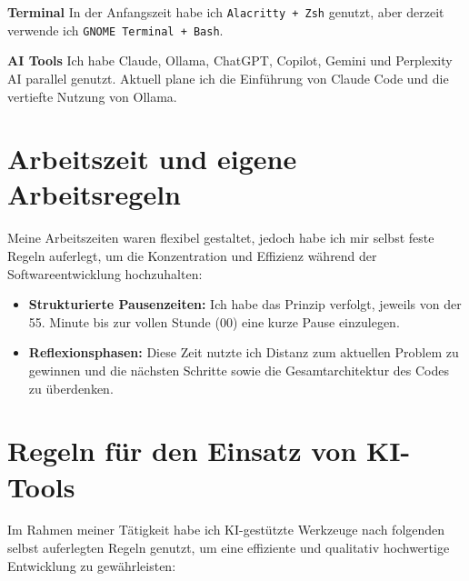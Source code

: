 \documentclass[12pt,a4paper]{report}
\begin{document}
\textbf{ Terminal }
In der Anfangszeit habe ich \texttt{Alacritty + Zsh} genutzt, aber derzeit verwende ich \texttt{GNOME Terminal + Bash}.

\textbf{ AI Tools }
Ich habe Claude, Ollama, ChatGPT, Copilot, Gemini und Perplexity AI parallel genutzt. 
Aktuell plane ich die Einführung von Claude Code und die vertiefte Nutzung von Ollama.
    

\section{Arbeitszeit und eigene Arbeitsregeln}
    Meine Arbeitszeiten waren flexibel gestaltet, jedoch habe ich mir selbst feste Regeln auferlegt, um die Konzentration und Effizienz während der Softwareentwicklung hochzuhalten:

    \begin{itemize}
        \item \textbf{Strukturierte Pausenzeiten:} Ich habe das Prinzip verfolgt, jeweils von der 55. Minute bis zur vollen Stunde (00) eine kurze Pause einzulegen.
        \item \textbf{Reflexionsphasen:} Diese Zeit nutzte ich Distanz zum aktuellen Problem zu gewinnen und die nächsten Schritte sowie die Gesamtarchitektur des Codes zu überdenken.
    \end{itemize}


    \section{Regeln für den Einsatz von KI-Tools}
    Im Rahmen meiner Tätigkeit habe ich KI-gestützte Werkzeuge nach folgenden selbst auferlegten Regeln genutzt,
    um eine effiziente und qualitativ hochwertige Entwicklung zu gewährleisten:
\end{document}

